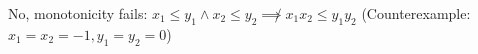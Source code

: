No, monotonicity fails: $x_1\leq y_1 \land x_2 \leq y_2 \not \implies x_1x_2 \leq y_1y_2$ (Counterexample: $x_1=x_2=-1, y_1=y_2=0$)

